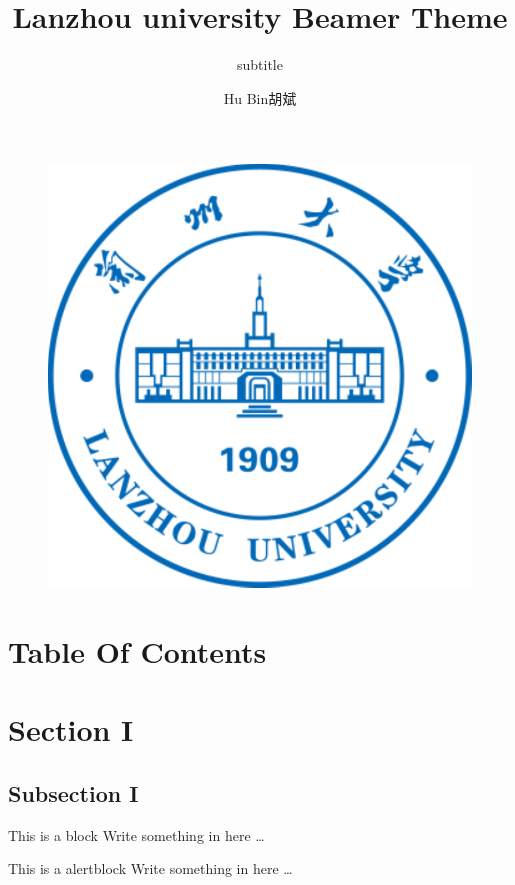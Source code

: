 \documentclass{beamer}
\begin{document}
\title{Lanzhou university Beamer Theme}
\subtitle{subtitle}
\author{Hu Bin胡斌}

\begin{frame}
\titlepage
\begin{figure}[htpb]
  \begin{center}
	\includegraphics[width=0.2\linewidth]{Lanzhou_University_Logo.pdf}
  \end{center}
\end{figure}
\end{frame}


\section*{Table Of Contents}
\begin{frame}
    \frametitle{\secname}
	\tableofcontents[hideallsubsections]%
\end{frame}


\section{Section I}
\subsection{Subsection I}
\begin{frame}
\begin{block}{This is a block}
Write something\cite{kocher99} in here \dots
\end{block}
\begin{alertblock}{This is a alertblock}
Write \alert{something} in here \dots
\end{alertblock}
\end{frame}
\end{document}
